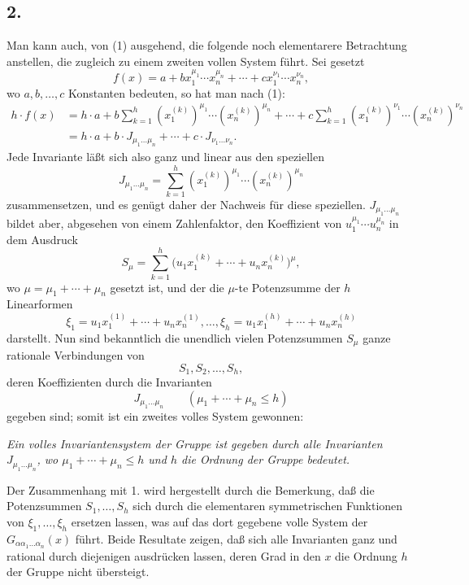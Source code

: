 \subsection*{2.}
Man kann auch, von (1) ausgehend, die folgende noch elementarere Betrachtung anstellen, die zugleich zu einem zweiten vollen System führt. Sei gesetzt
\[
  f(x)=a+b x_1^{\mu_1}\cdots x_n^{\mu_n}
       +\cdots+c x_1^{\nu_1}\cdots x_n^{\nu_n},
\]
wo $a,b,\ldots,c$ Konstanten bedeuten, so hat man nach (1):
\[
\begin{aligned}
 h\cdot f(x)
 &=h\cdot a+b\sum_{k=1}^{h}(x_1^{(k)})^{\mu_1}\cdots(x_n^{(k)})^{\mu_n}
     +\cdots
     +c\sum_{k=1}^{h}(x_1^{(k)})^{\nu_1}\cdots(x_n^{(k)})^{\nu_n} \\
 &=h\cdot a+b\cdot J_{\mu_1\ldots\mu_n}+\cdots+c\cdot J_{\nu_1\ldots\nu_n}.
\end{aligned}
\]
Jede Invariante läßt sich also ganz und linear aus den speziellen
\[
  J_{\mu_1\ldots\mu_n}
  =\sum_{k=1}^{h}(x_1^{(k)})^{\mu_1}\cdots(x_n^{(k)})^{\mu_n}
\]
zusammensetzen, und es genügt daher der Nachweis für diese speziellen. $J_{\mu_1\ldots\mu_n}$ bildet aber, abgesehen von einem Zahlenfaktor, den Koeffizient von $u_1^{\mu_1}\cdots u_n^{\mu_n}$ in dem Ausdruck
\[
  S_\mu=\sum_{k=1}^{h}
  \bigl(u_1x_1^{(k)}+\cdots+u_nx_n^{(k)}\bigr)^{\mu},
\]
wo $\mu=\mu_1+\cdots+\mu_n$ gesetzt ist, und der die $\mu$-te Potenzsumme der $h$ Linearformen
\[
  \xi_1=u_1x_1^{(1)}+\cdots+u_nx_n^{(1)},\ldots,
  \xi_h=u_1x_1^{(h)}+\cdots+u_nx_n^{(h)}
\]
darstellt. Nun sind bekanntlich die unendlich vielen Potenzsummen $S_\mu$ ganze rationale Verbindungen von
\[
  S_1,S_2,\ldots,S_h,
\]
deren Koeffizienten durch die Invarianten
\[
  J_{\mu_1\ldots\mu_n}\qquad(\mu_1+\cdots+\mu_n\le h)
\]
gegeben sind; somit ist ein zweites volles System gewonnen:

\emph{Ein volles Invariantensystem der Gruppe ist gegeben durch alle Invarianten $J_{\mu_1\ldots\mu_n}$, wo $\mu_1+\cdots+\mu_n\le h$ und $h$ die Ordnung der Gruppe bedeutet.}

Der Zusammenhang mit 1. wird hergestellt durch die Bemerkung, daß die Potenzsummen $S_1,\ldots,S_h$ sich durch die elementaren symmetrischen Funktionen von $\xi_1,\ldots,\xi_h$ ersetzen lassen, was auf das dort gegebene volle System der $G_{\alpha\alpha_1\ldots\alpha_n}(x)$ führt. Beide Resultate zeigen, daß sich alle Invarianten ganz und rational durch diejenigen ausdrücken lassen, deren Grad in den $x$ die Ordnung $h$ der Gruppe nicht übersteigt.

